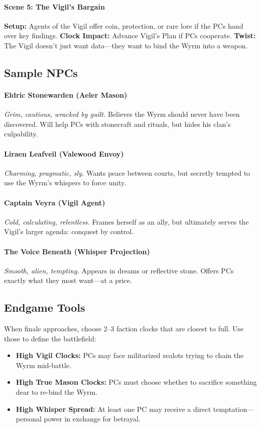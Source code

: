\documentclass[12pt]{book}
\begin{document}
\paragraph{Scene 5: The Vigil’s Bargain}
\textbf{Setup:} Agents of the Vigil offer coin, protection, or rare lore if the PCs hand over key findings.
\textbf{Clock Impact:} Advance Vigil’s Plan if PCs cooperate.
\textbf{Twist:} The Vigil doesn’t just want data—they want to bind the Wyrm into a weapon.

\subsection*{Sample NPCs}

\paragraph{Eldric Stonewarden (Aeler Mason)}
\emph{Grim, cautious, wracked by guilt.} Believes the Wyrm should never have been discovered. Will help PCs with stonecraft and rituals, but hides his clan’s culpability.

\paragraph{Liraen Leafveil (Valewood Envoy)}
\emph{Charming, pragmatic, sly.} Wants peace between courts, but secretly tempted to use the Wyrm’s whispers to force unity.

\paragraph{Captain Veyra (Vigil Agent)}
\emph{Cold, calculating, relentless.} Frames herself as an ally, but ultimately serves the Vigil’s larger agenda: conquest by control.

\paragraph{The Voice Beneath (Whisper Projection)}
\emph{Smooth, alien, tempting.} Appears in dreams or reflective stone. Offers PCs exactly what they most want—at a price.

\subsection*{Endgame Tools}
When finale approaches, choose 2--3 faction clocks that are closest to full. Use those to define the battlefield:
\begin{itemize}
  \item \textbf{High Vigil Clocks:} PCs may face militarized zealots trying to chain the Wyrm mid-battle.
  \item \textbf{High True Mason Clocks:} PCs must choose whether to sacrifice something dear to re-bind the Wyrm.
  \item \textbf{High Whisper Spread:} At least one PC may receive a direct temptation—personal power in exchange for betrayal.
\end{itemize}
\end{document}
